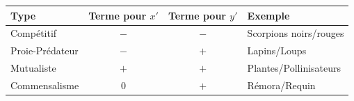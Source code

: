 \documentclass{article}
\begin{document}
\begin{center}
\begin{tabular}{|l|c|c|l|}
\hline
Type            & Terme pour \(x'\) & Terme pour \(y'\) & Exemple               \\  
\hline
Compétitif      & \(-\)              & \(-\)              & Scorpions noirs/rouges \\  
Proie-Prédateur & \(-\)              & \(+\)              & Lapins/Loups          \\  
Mutualiste      & \(+\)              & \(+\)              & Plantes/Pollinisateurs \\  
Commensalisme   & \(0\)              & \(+\)              & Rémora/Requin         \\  
\hline
\end{tabular}
\end{center}
\end{document}
